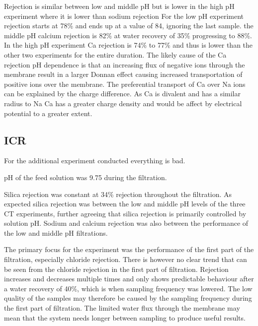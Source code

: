 Rejection is similar between low and middle pH but is lower in the high pH experiment where it is lower than sodium rejection
For the low pH experiment rejection starts at 78\% and ends up at a value of 84, ignoring the last sample.
the middle pH calcium rejection is 82\% at water recovery of 35\% progressing to 88\%.
In the high pH experiment Ca rejection is 74\% to 77\% and thus is lower than the other two experiments for the entire duration.
The likely cause of the Ca rejection pH dependence is that an increasing flux of negative ions through the membrane result in a larger Donnan effect causing increased transportation of positive ions over the membrane.
The preferential transport of Ca over Na ions can be explained by the charge difference.
As Ca is divalent and has a similar radius to Na  Ca has a greater charge density and would be affect by electrical potential to a greater extent.

\subsection{ICR}
For the additional experiment conducted everything is bad.

pH of the feed solution was 9.75 during the filtration.

Silica rejection was constant at 34\% rejection throughout the filtration.
As expected silica rejection was between the low and middle pH levels of the three CT experiments, further agreeing that silica rejection is primarily controlled by solution pH.
Sodium and calcium rejection was also between the performance of the low and middle pH filtrations.

The primary focus for the experiment was the  performance of the first part of the filtration, especially chloride rejection.
There is however no clear trend that can be seen from the chloride rejection in the first part of filtration.
Rejection increases and decreases multiple times and only shows predictable behaviour after a water recovery of 40\%, which is when sampling frequency was lowered.
The low quality of the samples may therefore be caused by the sampling frequency during the first part of filtration.
The limited water flux through the membrane may mean that the system needs longer between sampling to produce useful results.

